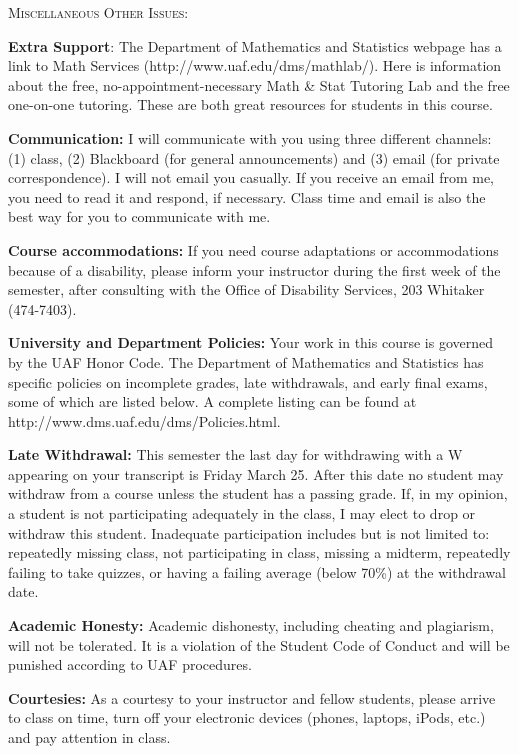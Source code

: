 \documentclass[11pt]{article}
\begin{document}
{{\textsc{Miscellaneous Other Issues:}

\textbf{Extra Support}: The Department of Mathematics and Statistics webpage has a link to  Math Services (http://www.uaf.edu/dms/mathlab/). Here is information about the free, no-appointment-necessary Math \& Stat Tutoring Lab and the free one-on-one tutoring. These are both great resources for students in this course.

\textbf{Communication:} I will communicate with you using three different channels: (1) class, (2) Blackboard (for general announcements) and (3) email (for private correspondence). I will not email you casually. If you receive an email from me, you need to read it and respond, if necessary.  Class time and email is also the best way for you to communicate with me. 

\textbf{Course accommodations:} If you need course adaptations or accommodations because of a
disability, please inform your instructor during the first week of the semester, after consulting
with the Office of Disability Services, 203 Whitaker (474-7403).

\textbf{University and Department Policies:} Your work in this course is governed by the UAF Honor
Code. The Department of Mathematics and Statistics has specific policies on incomplete grades,
late withdrawals, and early final exams, some of which are listed below. A complete listing
can be found at
http://www.dms.uaf.edu/dms/Policies.html.

\textbf{Late Withdrawal:} This semester the last day for withdrawing with a W  appearing on your
transcript is Friday March 25. After this date no student may withdraw from a course unless the student has a passing grade. If, in my opinion, a student is not participating adequately in the
class, I may elect to drop or withdraw this student. Inadequate participation includes but is not limited to: repeatedly missing class, not participating in class, missing a midterm, repeatedly failing to take quizzes, or having a failing average (below 70\%) at the withdrawal date.

\textbf{Academic Honesty:} Academic dishonesty, including cheating and plagiarism, will not be tolerated. It is a violation of the Student Code of Conduct and will be punished according to
UAF procedures.

\textbf{Courtesies:} As a courtesy to your instructor and fellow students, please arrive to class on
time, turn off your electronic devices (phones, laptops, iPods, etc.) and pay attention in class.\\

}}
\end{document}
